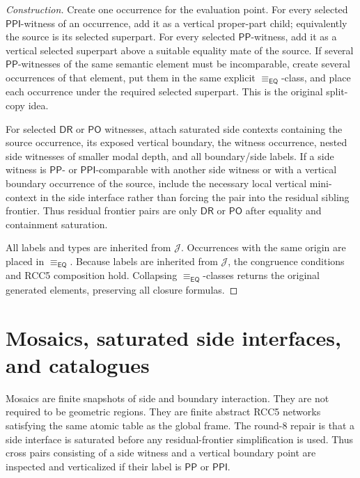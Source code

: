 \documentclass[11pt]{article}
\newcommand{\EQ}{\mathsf{EQ}}
\newcommand{\PP}{\mathsf{PP}}
\newcommand{\PPI}{\mathsf{PPI}}
\newcommand{\PO}{\mathsf{PO}}
\newcommand{\DR}{\mathsf{DR}}
\newcommand{\J}{\mathcal J}
\newcommand{\eqc}{\equiv_{\EQ}}
\begin{document}
\begin{proof}[Construction]
Create one occurrence for the evaluation point.  For every selected \(\PPI\)-witness of an occurrence, add it as a vertical proper-part child; equivalently the source is its selected superpart.  For every selected \(\PP\)-witness, add it as a vertical selected superpart above a suitable equality mate of the source.  If several \(\PP\)-witnesses of the same semantic element must be incomparable, create several occurrences of that element, put them in the same explicit \(\eqc\)-class, and place each occurrence under the required selected superpart.  This is the original split-copy idea.

For selected \(\DR\) or \(\PO\) witnesses, attach saturated side contexts containing the source occurrence, its exposed vertical boundary, the witness occurrence, nested side witnesses of smaller modal depth, and all boundary/side labels.  If a side witness is \(\PP\)- or \(\PPI\)-comparable with another side witness or with a vertical boundary occurrence of the source, include the necessary local vertical mini-context in the side interface rather than forcing the pair into the residual sibling frontier.  Thus residual frontier pairs are only \(\DR\) or \(\PO\) after equality and containment saturation.

All labels and types are inherited from \(\J\).  Occurrences with the same origin are placed in \(\eqc\).  Because labels are inherited from \(\J\), the congruence conditions and RCC5 composition hold.  Collapsing \(\eqc\)-classes returns the original generated elements, preserving all closure formulas.
\end{proof}

\section{Mosaics, saturated side interfaces, and catalogues}

Mosaics are finite snapshots of side and boundary interaction.  They are not required to be geometric regions.  They are finite abstract RCC5 networks satisfying the same atomic table as the global frame.  The round-8 repair is that a side interface is saturated before any residual-frontier simplification is used.  Thus cross pairs consisting of a side witness and a vertical boundary point are inspected and verticalized if their label is \(\PP\) or \(\PPI\).
\end{document}
